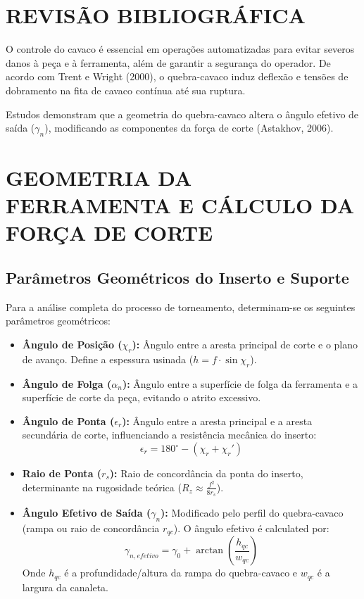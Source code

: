 \documentclass[a4paper,10pt]{article}
\begin{document}
\section{REVISÃO BIBLIOGRÁFICA}
O controle do cavaco é essencial em operações automatizadas para evitar severos danos à peça e à ferramenta, além de garantir a segurança do operador. De acordo com Trent e Wright (2000), o quebra-cavaco induz deflexão e tensões de dobramento na fita de cavaco contínua até sua ruptura.

Estudos demonstram que a geometria do quebra-cavaco altera o ângulo efetivo de saída ($\gamma_n$), modificando as componentes da força de corte (Astakhov, 2006).

\section{GEOMETRIA DA FERRAMENTA E CÁLCULO DA FORÇA DE CORTE}

\subsection{Parâmetros Geométricos do Inserto e Suporte}
Para a análise completa do processo de torneamento, determinam-se os seguintes parâmetros geométricos:
\begin{itemize}
    \item \textbf{Ângulo de Posição ($\chi_r$):} Ângulo entre a aresta principal de corte e o plano de avanço. Define a espessura usinada ($h = f \cdot \sin \chi_r$).
    \item \textbf{Ângulo de Folga ($\alpha_n$):} Ângulo entre a superfície de folga da ferramenta e a superfície de corte da peça, evitando o atrito excessivo.
    \item \textbf{Ângulo de Ponta ($\epsilon_r$):} Ângulo entre a aresta principal e a aresta secundária de corte, influenciando a resistência mecânica do inserto:
    \begin{equation}
        \epsilon_r = 180^\circ - (\chi_r + \chi_r')
    \end{equation}
    \item \textbf{Raio de Ponta ($r_s$):} Raio de concordância da ponta do inserto, determinante na rugosidade teórica ($R_z \approx \frac{f^2}{8 r_s}$).
    \item \textbf{Ângulo Efetivo de Saída ($\gamma_n$):} Modificado pelo perfil do quebra-cavaco (rampa ou raio de concordância $r_{qc}$). O ângulo efetivo é calculated por:
    \begin{equation}
        \gamma_{n,efetivo} = \gamma_0 + \arctan\left(\frac{h_{qc}}{w_{qc}}\right)
    \end{equation}
    Onde $h_{qc}$ é a profundidade/altura da rampa do quebra-cavaco e $w_{qc}$ é a largura da canaleta.
\end{itemize}
\end{document}
